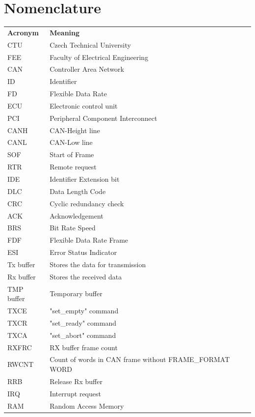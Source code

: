 \documentclass{ctuthesis}
\begin{document}
\maketitle
\chapter*{Nomenclature}

\noindent
\begin{tabularx}{\linewidth}
  { l >{\raggedright\arraybackslash}X }
\bfseries Acronym  & \bfseries Meaning \\\Midrule
CTU & Czech Technical University \\
FEE & Faculty of Electrical Engineering \\
CAN & Controller Area Network \\
ID & Identifier \\
FD & Flexible Data Rate \\
ECU & Electronic control unit \\
PCI & Peripheral Component Interconnect \\
CANH & CAN-Height line \\
CANL & CAN-Low line \\
SOF & Start of Frame \\
RTR & Remote request \\
IDE & Identifier Extension bit \\
DLC & Data Length Code \\
CRC & Cyclic redundancy check \\
ACK & Acknowledgement \\
BRS & Bit Rate Speed \\
FDF & Flexible Data Rate Frame \\
ESI & Error Status Indicator \\
Tx buffer & Stores the data for transmission \\
Rx buffer & Stores the received data \\
TMP buffer & Temporary buffer \\
TXCE & "set\_empty" command \\
TXCR & "set\_ready" command \\
TXCA & "set\_abort" command \\
RXFRC & RX buffer frame count \\
RWCNT & Count of words in CAN frame without FRAME\_FORMAT WORD \\
RRB & Release Rx buffer \\
IRQ & Interrupt request \\
RAM & Random Access Memory \\
\end{tabularx}
\end{document}
